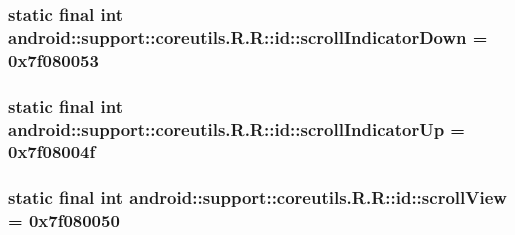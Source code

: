 \hypertarget{classandroid_1_1support_1_1coreutils_1_1_r_1_1id_c66bee07169689fbb47ca34b9a5d845e}{
\subsubsection[{scrollIndicatorDown}]{\setlength{\rightskip}{0pt plus 5cm}static final int android::support::coreutils.R.R::id::scrollIndicatorDown = 0x7f080053}}
\label{classandroid_1_1support_1_1coreutils_1_1_r_1_1id_c66bee07169689fbb47ca34b9a5d845e}


\hypertarget{classandroid_1_1support_1_1coreutils_1_1_r_1_1id_9b079ca0e8f60fc291d375bd556685b7}{
\subsubsection[{scrollIndicatorUp}]{\setlength{\rightskip}{0pt plus 5cm}static final int android::support::coreutils.R.R::id::scrollIndicatorUp = 0x7f08004f}}
\label{classandroid_1_1support_1_1coreutils_1_1_r_1_1id_9b079ca0e8f60fc291d375bd556685b7}


\hypertarget{classandroid_1_1support_1_1coreutils_1_1_r_1_1id_1086d8776135fef41c8695591f9427a7}{
\subsubsection[{scrollView}]{\setlength{\rightskip}{0pt plus 5cm}static final int android::support::coreutils.R.R::id::scrollView = 0x7f080050}}
\label{classandroid_1_1support_1_1coreutils_1_1_r_1_1id_1086d8776135fef41c8695591f9427a7}


